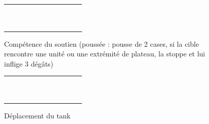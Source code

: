 \documentclass[a4paper]{scrreprt}
\begin{document}
\begin{figure}
    \centering
    \begin{tabular}{|c|c|c|c|c|c|c|c|c|c|c|}
        \hline
        &&&&&&&&&&\\ \hline  
        &&&&&&&&&&\\ \hline 
        &&&&&&&&&&\\ \hline
        &&&&&\cellcolor{cgreen}&&&&&\\ \hline
        &&&&&&&&&&\\ \hline
        &&&\cellcolor{cgreen}&&\cellcolor{yellow}&&\cellcolor{cgreen}&&&\\ \hline
        &&&&&&&&&&\\ \hline
        &&&&&\cellcolor{cgreen}&&&&&\\ \hline
        &&&&&&&&&&\\ \hline
        &&&&&&&&&&\\ \hline
        &&&&&&&&&&\\ \hline
        
    \end{tabular}
    \caption{Compétence du soutien (poussée : pousse de 2 cases, si la cible rencontre une unité ou une extrémité de plateau, la stoppe et lui inflige 3 dégâts)}
    \label{fig:soutiencomp}
\end{figure}

\begin{figure}
    \centering
    \begin{tabular}{|c|c|c|c|c|c|c|c|c|c|c|}
        \hline
        &&&&&&&&&&\\ \hline  
        &&&&&&&&&&\\ \hline 
        &&&&&&&&&&\\ \hline
        &&&&&\cellcolor{cblue}&&&&&\\ \hline
        &&&&\cellcolor{cblue}&\cellcolor{cblue}&\cellcolor{cblue}&&&&\\ \hline
        &&&&\cellcolor{cblue}&\cellcolor{yellow}&\cellcolor{cblue}&&&&\\ \hline
        &&&&\cellcolor{cblue}&\cellcolor{cblue}&\cellcolor{cblue}&&&&\\ \hline
        &&&&&\cellcolor{cblue}&&&&&\\ \hline
        &&&&&&&&&&\\ \hline
        &&&&&&&&&&\\ \hline
        &&&&&&&&&&\\ \hline
        
    \end{tabular}
    \caption{Déplacement du tank}
    \label{fig:tankdep}
\end{figure}
\end{document}
